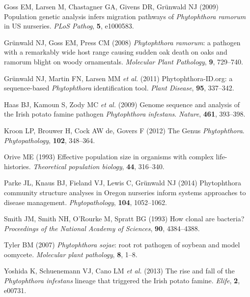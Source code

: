 \documentclass[double,12pt]{beavtex}
\begin{document}
  \hypertarget{ref-goss2009population}{}
  Goss EM, Larsen M, Chastagner GA, Givens DR, Grünwald NJ (2009)
  Population genetic analysis infers migration pathways of
  \emph{Phytophthora ramorum} in US nurseries. \emph{PLoS Pathog},
  \textbf{5}, e1000583.
  
  \hypertarget{ref-grunwald2008phytophthora}{}
  Grünwald NJ, Goss EM, Press CM (2008) \emph{Phytophthora ramorum}: a
  pathogen with a remarkably wide host range causing sudden oak death on
  oaks and ramorum blight on woody ornamentals. \emph{Molecular Plant
  Pathology}, \textbf{9}, 729--740.
  
  \hypertarget{ref-grunwald2011phytophthora}{}
  Grünwald NJ, Martin FN, Larsen MM \emph{et al.} (2011)
  Phytophthora-ID.org: a sequence-based \emph{Phytophthora} identification
  tool. \emph{Plant Disease}, \textbf{95}, 337--342.
  
  \hypertarget{ref-haas2009genome}{}
  Haas BJ, Kamoun S, Zody MC \emph{et al.} (2009) Genome sequence and
  analysis of the Irish potato famine pathogen \emph{Phytophthora
  infestans}. \emph{Nature}, \textbf{461}, 393--398.
  
  \hypertarget{ref-kroon2012genus}{}
  Kroon LP, Brouwer H, Cock AW de, Govers F (2012) The Genus
  \emph{Phytophthora}. \emph{Phytopathology}, \textbf{102}, 348--364.
  
  \hypertarget{ref-orive1993effective}{}
  Orive ME (1993) Effective population size in organisms with complex
  life-histories. \emph{Theoretical population biology}, \textbf{44},
  316--340.
  
  \hypertarget{ref-parke2014phytophthora}{}
  Parke JL, Knaus BJ, Fieland VJ, Lewis C, Grünwald NJ (2014) Phytophthora
  community structure analyses in Oregon nurseries inform systems
  approaches to disease management. \emph{Phytopathology}, \textbf{104},
  1052--1062.
  
  \hypertarget{ref-smith1993how}{}
  Smith JM, Smith NH, O'Rourke M, Spratt BG (1993) How clonal are
  bacteria? \emph{Proceedings of the National Academy of Sciences},
  \textbf{90}, 4384--4388.
  
  \hypertarget{ref-tyler2007phytophthora}{}
  Tyler BM (2007) \emph{Phytophthora sojae}: root rot pathogen of soybean
  and model oomycete. \emph{Molecular plant pathology}, \textbf{8}, 1--8.
  
  \hypertarget{ref-yoshida2013rise}{}
  Yoshida K, Schuenemann VJ, Cano LM \emph{et al.} (2013) The rise and
  fall of the \emph{Phytophthora infestans} lineage that triggered the
  Irish potato famine. \emph{Elife}, \textbf{2}, e00731.
\end{document}
